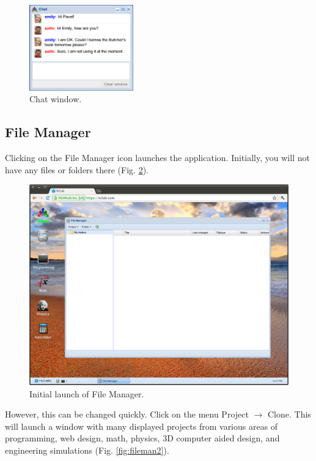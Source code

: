\documentclass[article,A4,12pt]{llncs}
\begin{document}
\begin{figure}[!ht]
\begin{center}
\includegraphics[width=0.4\textwidth]{img/chat.png}
\end{center}
\caption{Chat window.}
\label{fig:chat}
\end{figure}

\subsection{File Manager}

Clicking on the File Manager icon launches the application. Initially, you will not 
have any files or folders there (Fig. \ref{fig:fileman}).

\begin{figure}[!ht]
\begin{center}
\includegraphics[width=\textwidth]{img/fileman1.png}
\end{center}
\caption{Initial launch of File Manager.}
\label{fig:fileman}
\end{figure}
\noindent
However, this can be changed quickly. Click on the menu Project $\rightarrow$ Clone. This will
launch a window with many displayed projects from various areas of programming, web design, math, 
physics, 3D computer aided design, and engineering simulations (Fig. \ref{fig:fileman2}).
\end{document}
